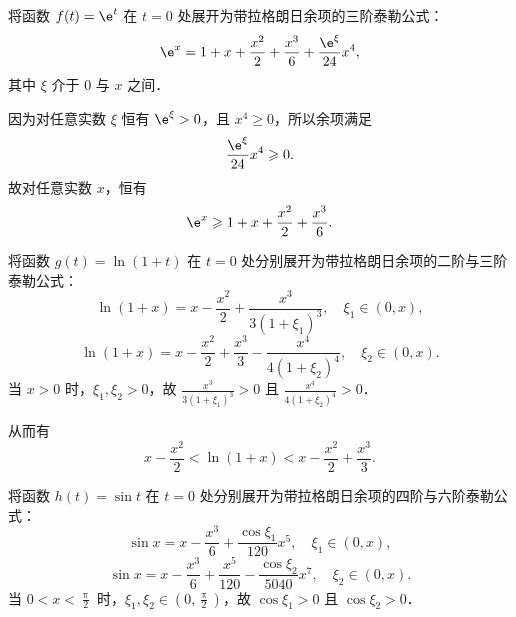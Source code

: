 \begin{myproof}

    将函数 $f(t) = \e^t$ 在 $t = 0$ 处展开为带拉格朗日余项的三阶泰勒公式：
    \begin{equation}
        \e^x = 1 + x + \frac{x^2}{2} + \frac{x^3}{6} + \frac{\e^\xi}{24}x^4,
    \end{equation}
    其中 $\xi$ 介于 $0$ 与 $x$ 之间．

    因为对任意实数 $\xi$ 恒有 $\e^\xi > 0$，且 $x^4 \geqslant 0$，所以余项满足
    \begin{equation}
        \frac{\e^\xi}{24}x^4 \geqslant 0.
    \end{equation}
    故对任意实数 $x$，恒有
    \begin{equation}
        \e^x \geqslant 1 + x + \frac{x^2}{2} + \frac{x^3}{6}.
    \end{equation}


    将函数 $g(t) = \ln(1 + t)$ 在 $t = 0$ 处分别展开为带拉格朗日余项的二阶与三阶泰勒公式：
    \begin{equation}
        \ln(1 + x) = x - \frac{x^2}{2} + \frac{x^3}{3(1 + \xi_1)^3}, \quad \xi_1 \in (0, x),
    \end{equation}
    \begin{equation}
        \ln(1 + x) = x - \frac{x^2}{2} + \frac{x^3}{3} - \frac{x^4}{4(1 + \xi_2)^4}, \quad \xi_2 \in (0, x).
    \end{equation}
    当 $x > 0$ 时，$\xi_1, \xi_2 > 0$，故 $\frac{x^3}{3(1 + \xi_1)^3} > 0$ 且 $\frac{x^4}{4(1 + \xi_2)^4} > 0$．

    从而有
    \begin{equation}
        x - \frac{x^2}{2} < \ln(1 + x) < x - \frac{x^2}{2} + \frac{x^3}{3}.
    \end{equation}


    将函数 $h(t) = \sin t$ 在 $t = 0$ 处分别展开为带拉格朗日余项的四阶与六阶泰勒公式：
    \begin{equation}
        \sin x = x - \frac{x^3}{6} + \frac{\cos\xi_1}{120}x^5, \quad \xi_1 \in (0, x),
    \end{equation}
    \begin{equation}
        \sin x = x - \frac{x^3}{6} + \frac{x^5}{120} - \frac{\cos\xi_2}{5040}x^7, \quad \xi_2 \in (0, x).
    \end{equation}
    当 $0 < x < \frac{\uppi}{2}$ 时，$\xi_1, \xi_2 \in \left(0, \frac{\uppi}{2}\right)$，故 $\cos\xi_1 > 0$ 且 $\cos\xi_2 > 0$．


\end{myproof}

